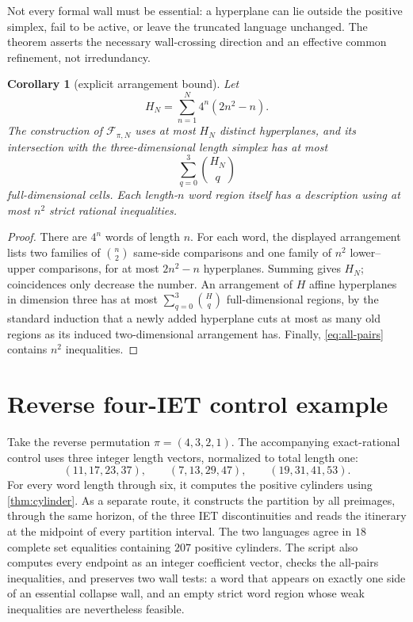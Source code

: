 \documentclass[11pt,a4paper]{amsart}
\newtheorem{corollary}[theorem]{Corollary}
\theoremstyle{definition}
\theoremstyle{remark}
\newcommand{\cF}{\mathcal F}
\begin{document}
Not every formal wall must be essential: a hyperplane can lie outside the
positive simplex, fail to be active, or leave the truncated language
unchanged.  The theorem asserts the necessary wall-crossing direction and an
effective common refinement, not irredundancy.

\begin{corollary}[explicit arrangement bound]\label{cor:size-bound}
Let
\[
 H_N=\sum_{n=1}^N4^n(2n^2-n).
\]
The construction of $\cF_{\pi,N}$ uses at most $H_N$ distinct hyperplanes,
and its intersection with the three-dimensional length simplex has at most
\[
 \sum_{q=0}^3\binom{H_N}{q}
\]
full-dimensional cells.  Each length-$n$ word region itself has a description
using at most $n^2$ strict rational inequalities.
\end{corollary}

\begin{proof}
There are $4^n$ words of length $n$.  For each word, the displayed
arrangement lists two families of $\binom n2$ same-side comparisons and one
family of $n^2$ lower--upper comparisons, for at most $2n^2-n$ hyperplanes.
Summing gives $H_N$; coincidences only decrease the number.  An arrangement
of $H$ affine hyperplanes in dimension three has at most
$\sum_{q=0}^3\binom Hq$ full-dimensional regions, by the standard induction
that a newly added hyperplane cuts at most as many old regions as its induced
two-dimensional arrangement has.  Finally, \eqref{eq:all-pairs} contains
$n^2$ inequalities.
\end{proof}

\section{Reverse four-IET control example}

Take the reverse permutation $\pi=(4,3,2,1)$.  The accompanying exact-rational
control uses three integer length vectors, normalized to total length one:
\[
 (11,17,23,37),\qquad(7,13,29,47),\qquad(19,31,41,53).
\]
For every word length through six, it computes the positive cylinders using
\cref{thm:cylinder}.  As a separate route, it constructs the partition by all
preimages, through the same horizon, of the three IET discontinuities and
reads the itinerary at the midpoint of every partition interval.  The two
languages agree in $18$ complete set equalities containing $207$ positive
cylinders.  The script also computes every endpoint as an integer coefficient
vector, checks the all-pairs inequalities, and preserves two wall tests: a
word that appears on exactly one side of an essential collapse wall, and an
empty strict word region whose weak inequalities are nevertheless feasible.
\end{document}
